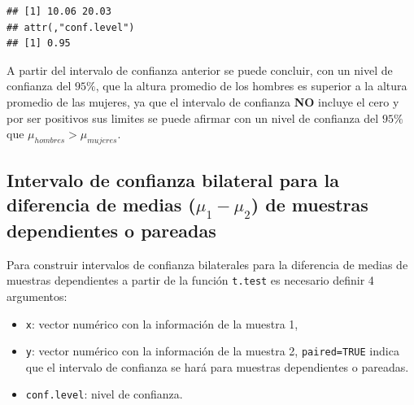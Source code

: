 \documentclass[10pt,]{krantz}
\makeatletter
\newenvironment{Shaded}{\begin{snugshade}}{\end{snugshade}}
\newcommand{\KeywordTok}[1]{\textcolor[rgb]{0.13,0.29,0.53}{\textbf{{#1}}}}
\newcommand{\DataTypeTok}[1]{\textcolor[rgb]{0.13,0.29,0.53}{{#1}}}
\newcommand{\FloatTok}[1]{\textcolor[rgb]{0.00,0.00,0.81}{{#1}}}
\newcommand{\OtherTok}[1]{\textcolor[rgb]{0.56,0.35,0.01}{{#1}}}
\newcommand{\NormalTok}[1]{{#1}}
\providecommand{\tightlist}{%
  \setlength{\itemsep}{0pt}\setlength{\parskip}{0pt}}
\newenvironment{kframe}{%
\medskip{}
\setlength{\fboxsep}{.8em}
 \def\at@end@of@kframe{}%
 \ifinner\ifhmode%
  \def\at@end@of@kframe{\end{minipage}}%
  \begin{minipage}{\columnwidth}%
 \fi\fi%
 \def\FrameCommand##1{\hskip\@totalleftmargin \hskip-\fboxsep
 \colorbox{shadecolor}{##1}\hskip-\fboxsep
     \hskip-\linewidth \hskip-\@totalleftmargin \hskip\columnwidth}%
 \MakeFramed {\advance\hsize-\width
   \@totalleftmargin\z@ \linewidth\hsize
   \@setminipage}}%
 {\par\unskip\endMakeFramed%
 \at@end@of@kframe}
\renewenvironment{Shaded}{\begin{kframe}}{\end{kframe}}
\makeatother
\begin{document}
\begin{Shaded}
\end{Shaded}

\begin{verbatim}
## [1] 10.06 20.03
## attr(,"conf.level")
## [1] 0.95
\end{verbatim}

A partir del intervalo de confianza anterior se puede concluir, con un
nivel de confianza del \(95\%\), que la altura promedio de los hombres
es superior a la altura promedio de las mujeres, ya que el intervalo de
confianza \textbf{NO} incluye el cero y por ser positivos sus limites se
puede afirmar con un nivel de confianza del \(95\%\) que
\(\mu_{hombres} > \mu_{mujeres}\).

\subsection{\texorpdfstring{Intervalo de confianza bilateral para la
diferencia de medias (\(\mu_1-\mu_2\)) de muestras dependientes o
pareadas}{Intervalo de confianza bilateral para la diferencia de medias (\textbackslash{}mu\_1-\textbackslash{}mu\_2) de muestras dependientes o pareadas}}\label{intervalo-de-confianza-bilateral-para-la-diferencia-de-medias-mu_1-mu_2-de-muestras-dependientes-o-pareadas}

Para construir intervalos de confianza bilaterales para la diferencia de
medias de muestras dependientes a partir de la función \texttt{t.test}
es necesario definir 4 argumentos:

\begin{itemize}
\tightlist
\item
  \texttt{x}: vector numérico con la información de la muestra 1,
\item
  \texttt{y}: vector numérico con la información de la muestra 2,
  \texttt{paired=TRUE} indica que el intervalo de confianza se hará para
  muestras dependientes o pareadas.
\item
  \texttt{conf.level}: nivel de confianza.
\end{itemize}
\end{document}
